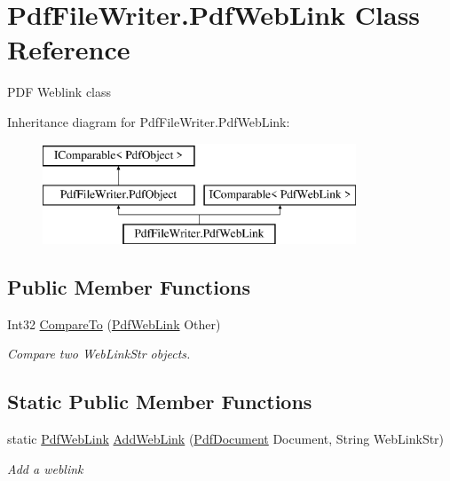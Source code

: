 \hypertarget{class_pdf_file_writer_1_1_pdf_web_link}{}\section{Pdf\+File\+Writer.\+Pdf\+Web\+Link Class Reference}
\label{class_pdf_file_writer_1_1_pdf_web_link}


P\+DF Weblink class  


Inheritance diagram for Pdf\+File\+Writer.\+Pdf\+Web\+Link\+:\begin{figure}[H]
\begin{center}
\leavevmode
\includegraphics[height=3.000000cm]{class_pdf_file_writer_1_1_pdf_web_link}
\end{center}
\end{figure}
\subsection*{Public Member Functions}
\begin{DoxyCompactItemize}
\item 
Int32 \hyperlink{class_pdf_file_writer_1_1_pdf_web_link_a1415a733ad62aa1be6970261d3d3c21c}{Compare\+To} (\hyperlink{class_pdf_file_writer_1_1_pdf_web_link}{Pdf\+Web\+Link} Other)
\begin{DoxyCompactList}\small\item\em Compare two Web\+Link\+Str objects. \end{DoxyCompactList}\end{DoxyCompactItemize}
\subsection*{Static Public Member Functions}
\begin{DoxyCompactItemize}
\item 
static \hyperlink{class_pdf_file_writer_1_1_pdf_web_link}{Pdf\+Web\+Link} \hyperlink{class_pdf_file_writer_1_1_pdf_web_link_aea988b0ee70f0bae0fc4d191ae6600df}{Add\+Web\+Link} (\hyperlink{class_pdf_file_writer_1_1_pdf_document}{Pdf\+Document} Document, String Web\+Link\+Str)
\begin{DoxyCompactList}\small\item\em Add a weblink \end{DoxyCompactList}\end{DoxyCompactItemize}


